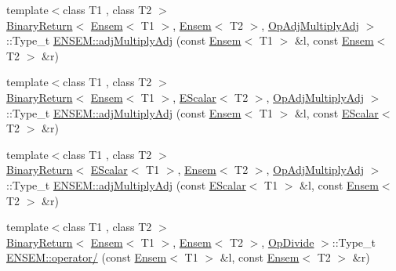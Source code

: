 \begin{DoxyCompactItemize}
{\footnotesize template$<$class T1 , class T2 $>$ }\\\mbox{\hyperlink{structENSEM_1_1BinaryReturn}{Binary\+Return}}$<$ \mbox{\hyperlink{classENSEM_1_1Ensem}{Ensem}}$<$ T1 $>$, \mbox{\hyperlink{classENSEM_1_1Ensem}{Ensem}}$<$ T2 $>$, \mbox{\hyperlink{structENSEM_1_1OpAdjMultiplyAdj}{Op\+Adj\+Multiply\+Adj}} $>$\+::Type\+\_\+t \mbox{\hyperlink{group__eensem_gaf92e62b8e69b299d4f4193702fb8dab3}{E\+N\+S\+E\+M\+::adj\+Multiply\+Adj}} (const \mbox{\hyperlink{classENSEM_1_1Ensem}{Ensem}}$<$ T1 $>$ \&l, const \mbox{\hyperlink{classENSEM_1_1Ensem}{Ensem}}$<$ T2 $>$ \&r)
\item 
{\footnotesize template$<$class T1 , class T2 $>$ }\\\mbox{\hyperlink{structENSEM_1_1BinaryReturn}{Binary\+Return}}$<$ \mbox{\hyperlink{classENSEM_1_1Ensem}{Ensem}}$<$ T1 $>$, \mbox{\hyperlink{classENSEM_1_1EScalar}{E\+Scalar}}$<$ T2 $>$, \mbox{\hyperlink{structENSEM_1_1OpAdjMultiplyAdj}{Op\+Adj\+Multiply\+Adj}} $>$\+::Type\+\_\+t \mbox{\hyperlink{group__eensem_gac275cf78eef2b465d5278ed910042f03}{E\+N\+S\+E\+M\+::adj\+Multiply\+Adj}} (const \mbox{\hyperlink{classENSEM_1_1Ensem}{Ensem}}$<$ T1 $>$ \&l, const \mbox{\hyperlink{classENSEM_1_1EScalar}{E\+Scalar}}$<$ T2 $>$ \&r)
\item 
{\footnotesize template$<$class T1 , class T2 $>$ }\\\mbox{\hyperlink{structENSEM_1_1BinaryReturn}{Binary\+Return}}$<$ \mbox{\hyperlink{classENSEM_1_1EScalar}{E\+Scalar}}$<$ T1 $>$, \mbox{\hyperlink{classENSEM_1_1Ensem}{Ensem}}$<$ T2 $>$, \mbox{\hyperlink{structENSEM_1_1OpAdjMultiplyAdj}{Op\+Adj\+Multiply\+Adj}} $>$\+::Type\+\_\+t \mbox{\hyperlink{group__eensem_ga58683063315813c7adaca604c28f954f}{E\+N\+S\+E\+M\+::adj\+Multiply\+Adj}} (const \mbox{\hyperlink{classENSEM_1_1EScalar}{E\+Scalar}}$<$ T1 $>$ \&l, const \mbox{\hyperlink{classENSEM_1_1Ensem}{Ensem}}$<$ T2 $>$ \&r)
\item 
{\footnotesize template$<$class T1 , class T2 $>$ }\\\mbox{\hyperlink{structENSEM_1_1BinaryReturn}{Binary\+Return}}$<$ \mbox{\hyperlink{classENSEM_1_1Ensem}{Ensem}}$<$ T1 $>$, \mbox{\hyperlink{classENSEM_1_1Ensem}{Ensem}}$<$ T2 $>$, \mbox{\hyperlink{structENSEM_1_1OpDivide}{Op\+Divide}} $>$\+::Type\+\_\+t \mbox{\hyperlink{group__eensem_ga4294d59488c65a0e8cb9e552578bfd86}{E\+N\+S\+E\+M\+::operator/}} (const \mbox{\hyperlink{classENSEM_1_1Ensem}{Ensem}}$<$ T1 $>$ \&l, const \mbox{\hyperlink{classENSEM_1_1Ensem}{Ensem}}$<$ T2 $>$ \&r)
\item 

\end{DoxyCompactItemize}
